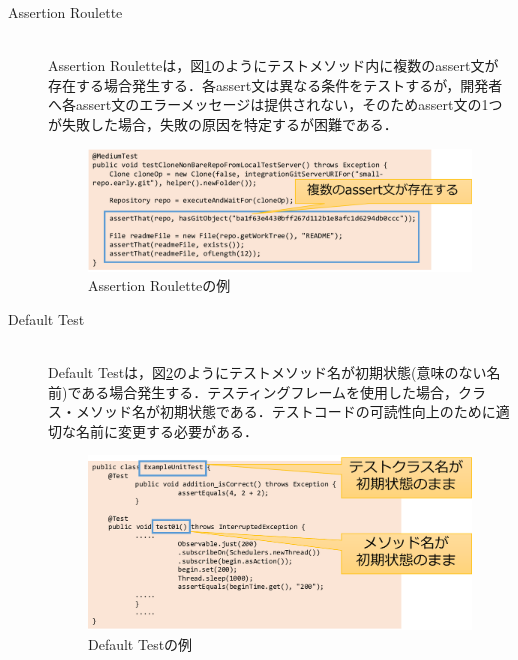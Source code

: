 \documentclass[12pt]{jarticle} %
\begin{document}
\begin{description}
\item[Assertion Roulette]~\\
Assertion Rouletteは，図\ref{AR}のようにテストメソッド内に複数のassert文が存在する場合発生する．各assert文は異なる条件をテストするが，開発者へ各assert文のエラーメッセージは提供されない，そのためassert文の1つが失敗した場合，失敗の原因を特定するが困難である．

\begin{figure}[htbp]
  \begin{center}
    \includegraphics[clip,width=15cm]{AR.pdf}
    \caption{Assertion Rouletteの例}
    \label{AR}
  \end{center}
\end{figure}

\item[Default Test]~\\
Default Testは，図\ref{DT}のようにテストメソッド名が初期状態(意味のない名前)である場合発生する．テスティングフレームを使用した場合，クラス・メソッド名が初期状態である．テストコードの可読性向上のために適切な名前に変更する必要がある．

\begin{figure}[htbp]
  \begin{center}
    \includegraphics[clip,width=15cm]{DT.pdf}
    \caption{Default Testの例}
    \label{DT}
  \end{center}
\end{figure}


\end{description}
\end{document}
